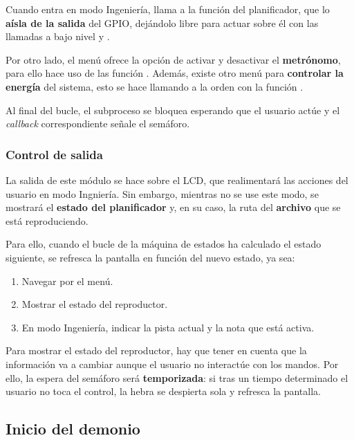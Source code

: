 Cuando entra en modo Ingeniería, llama a la función  del planificador, que lo \textbf{aísla de la salida} del \acrshort{GPIO}, dejándolo libre para actuar sobre él con las llamadas a bajo nivel  y .

Por otro lado, el menú ofrece la opción de activar y desactivar el \textbf{metrónomo}, para ello hace uso de las función . Además, existe otro menú para \textbf{controlar la energía} del sistema, esto se hace llamando a la orden  con la función .

Al final del bucle, el subproceso se bloquea esperando que el usuario actúe y el \textit{callback} correspondiente señale el semáforo.

\subsubsection{Control de salida}

La salida de este módulo se hace sobre el \acrshort{LCD}, que realimentará las acciones del usuario en modo Ingniería. Sin embargo, mientras no se use este modo, se mostrará el \textbf{estado del planificador} y, en su caso, la ruta del \textbf{archivo} que se está reproduciendo.

Para ello, cuando el bucle de la máquina de estados ha calculado el estado siguiente, se refresca la pantalla en función del nuevo estado, ya sea:

\begin{enumerate}
	\item Navegar por el menú.
	\item Mostrar el estado del reproductor.
	\item En modo Ingeniería, indicar la pista actual y la nota que está activa.
\end{enumerate}

Para mostrar el estado del reproductor, hay que tener en cuenta que la información va a cambiar aunque el usuario no interactúe con los mandos. Por ello, la espera del semáforo será \textbf{temporizada}: si tras un tiempo determinado el usuario no toca el control, la hebra se despierta sola y refresca la pantalla.

\subsection{Inicio del demonio}

